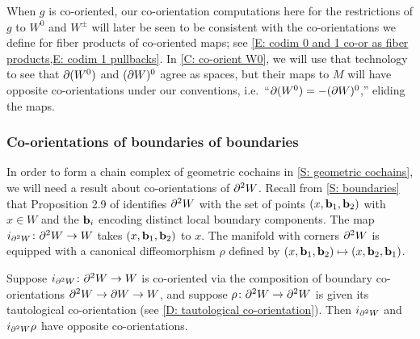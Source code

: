\begin{example}
	When $g$ is co-oriented, our co-orientation computations here for the restrictions of $g$ to $W^0$ and $W^\pm$ will later be seen to be consistent with the co-orientations we define for fiber products of co-oriented maps; see \cref{E: codim 0 and 1 co-or as fiber products,E: codim 1 pullbacks}.
	In \cref{C: co-orient W0}, we will use that technology to see that $\partial (W^0)$ and $(\partial W)^0$ agree as spaces, but their maps to $M$ will have opposite co-orientations under our conventions, i.e.\ ``$\partial (W^0) = -(\partial W)^0$,'' eliding the maps.
\end{example}

\subsubsection{Co-orientations of boundaries of boundaries}

In order to form a chain complex of geometric cochains in \cref{S: geometric cochains}, we will need a result about co-orientations of $\partial^2 W$.
Recall from \cref{S: boundaries} that Proposition 2.9 of \cite{Joy12} identifies $\partial^2 W$ with the set of points $(x,\mathbf{b}_1,\mathbf{b}_2)$ with $x \in W$ and the $\mathbf{b}_i$ encoding distinct local boundary components.
The map $i_{\partial^2 W} \colon \partial^2 W \to W$ takes $(x,\mathbf{b}_1,\mathbf{b}_2)$ to $x$.
The manifold with corners $\partial^2 W$ is equipped with a canonical diffeomorphism $\rho$ defined by $(x,\mathbf{b}_1,\mathbf{b}_2) \mapsto (x,\mathbf{b}_2,\mathbf{b}_1)$.

\begin{lemma}\label{L: boundary2}
	Suppose $i_{\partial^2 W} \colon \partial^2 W \to W$ is co-oriented via the composition of boundary co-orientations $\partial^2 W \to \partial W \to W$, and suppose $\rho \colon \partial^2 W \to \partial^2 W$ is given its tautological co-orientation (see \cref{D: tautological co-orientation}).
	Then $i_{\partial^2 W}$ and $i_{\partial^2 W}\rho$ have opposite co-orientations.
\end{lemma}

